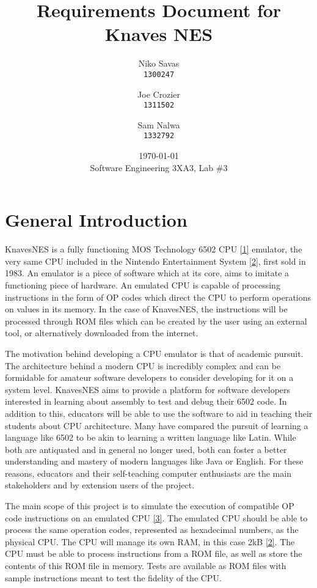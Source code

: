 \documentclass[12pt]{article}
\begin{document}
\title{Requirements Document for Knaves NES}
\date{\today\\
	{\medskip\small Software Engineering 3XA3, Lab \#3}
}
\author{Niko Savas\\
	\texttt{1300247}
	\and
	Joe Crozier\\
	\texttt{1311502}
	\and
	Sam Nalwa\\
	\texttt{1332792}
}

\maketitle
\clearpage

\tableofcontents
\clearpage

\section{General Introduction}
	KnavesNES is a fully functioning MOS Technology 6502 CPU \hyperlink{refs}{[1]} emulator, the very same CPU included in the Nintendo Entertainment System \hyperlink{refs}{[2]}, first sold in 1983. An emulator is a piece of software which at its core, aims to imitate a functioning piece of hardware. An emulated CPU is capable of processing instructions in the form of OP codes which direct the CPU to perform operations on values in its memory. In the case of KnavesNES, the instructions will be processed through ROM files which can be created by the user using an external tool, or alternatively downloaded from the internet.  

	The motivation behind developing a CPU emulator is that of academic pursuit. The architecture behind a modern CPU is incredibly complex and can be formidable for amateur software developers to consider developing for it on a system level. KnavesNES aims to provide a platform for software developers interested in learning about assembly to test and debug their 6502 code. In addition to this, educators will be able to use the software to aid in teaching their students about CPU architecture. Many have compared the pursuit of learning a language like 6502 to be akin to learning a written language like Latin. While both are antiquated and in general no longer used, both can foster a better understanding and mastery of modern languages like Java or English. For these reasons, educators and their self-teaching computer enthusiasts are the main stakeholders and by extension users of the project. 

	The main scope of this project is to simulate the execution of compatible OP code instructions on an emulated CPU \hyperlink{refs}{[3]}. The emulated CPU should be able to process the same operation codes, represented as hexadecimal numbers, as the physical CPU. The CPU will manage its own RAM, in this case 2kB \hyperlink{refs}{[2]}. The CPU must be able to process instructions from a ROM file, as well as store the contents of this ROM file in memory. Tests are available as ROM files with sample instructions meant to test the fidelity of the CPU. 
\end{document}
